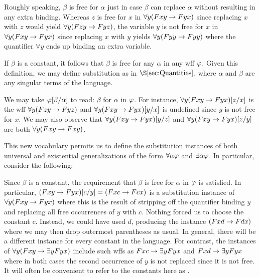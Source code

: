 
Roughly speaking, $\beta$ is free for $\alpha$ just in case $\beta$ can replace $\alpha$ without resulting in any extra binding.
Whereas $z$ is free for $x$ in $\forall y(Fxy \rightarrow Fyx)$ since replacing $x$ with $z$ would yield $\forall y(Fzy \rightarrow Fyz)$, the variable $y$ is not free for $x$ in $\forall y(Fxy \rightarrow Fyx)$ since replacing $x$ with $y$ yields $\forall y(Fyy \rightarrow Fyy)$ where the quantifier $\forall y$ ends up binding an extra variable.

If $\beta$ is a constant, it follows that $\beta$ is free for any $\alpha$ in any wff $\varphi$. 
Given this definition, we may define substitution as in $\S\ref{sec:Quantities}$, where $\alpha$ and $\beta$ are any singular terms of the language.


We may take $\varphi[\beta/\alpha]$ to read: $\beta$ for $\alpha$ in $\varphi$.
For instance, $\forall y(Fxy \rightarrow Fyx)[z/x]$ is the wff $\forall y(Fzy \rightarrow Fyz)$ and $\forall y(Fxy \rightarrow Fyx)[y/x]$ is undefined since $y$ is not free for $x$.
We may also observe that $\forall y(Fxy \rightarrow Fyx)[y/z]$ and $\forall y(Fxy \rightarrow Fyx)[z/y]$ are both $\forall y(Fxy \rightarrow Fxy)$.

This new vocabulary permits us to define the substitution instances of both universal and existential generalizations of the form $\forall \alpha\varphi$ and $\exists \alpha\varphi$.
In particular, consider the following:


Since $\beta$ is a constant, the requirement that $\beta$ is free for $\alpha$ in $\varphi$ is satisfied.
In particular, $(Fxy \rightarrow Fyx)[c/y] = (Fxc \rightarrow Fcx)$ is a substitution instance of $\forall y(Fxy \rightarrow Fyx)$ where this is the result of stripping off the quantifier binding $y$ and replacing all free occurrences of $y$ with $c$. 
Nothing forced us to choose the constant $c$.
Instead, we could have used $d$, producing the instance $(Fxd \rightarrow Fdx)$ where we may then drop outermost parentheses as usual.
In general, there will be a different instance for every constant in the language.
For contrast, the instances of $\forall y(Fxy \rightarrow \exists yFyx)$ include such wffs as $Fxc \rightarrow \exists yFyx$ and $Fxd \rightarrow \exists yFyx$ where in both cases the second occurrence of $y$ is not replaced since it is not free. 
It will often be convenient to refer to the constants here as .




